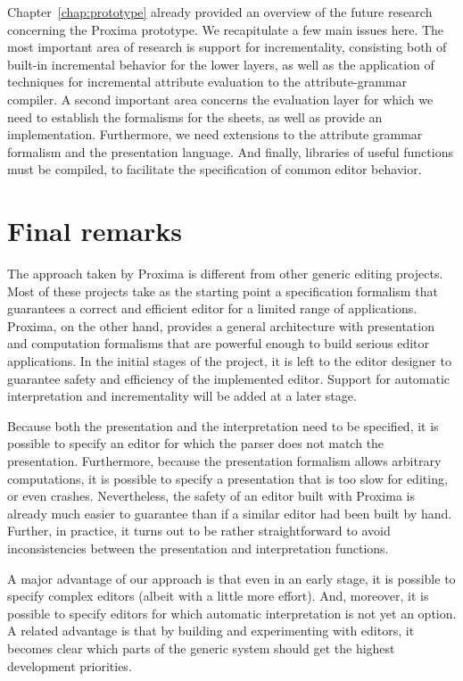 Chapter~\ref{chap:prototype} already provided an overview of the future research concerning the Proxima prototype. We recapitulate a few main issues here. The most important area of research is support for incrementality, consisting both of built-in incremental behavior for the lower layers, as well as the application of techniques for incremental attribute evaluation to the attribute-grammar compiler. A second important area concerns the evaluation layer for which we need to establish the formalisms for the sheets, as well as provide an implementation. Furthermore, we need extensions to the attribute grammar formalism and the {\Xprez} presentation language.  And finally, libraries of useful functions must be compiled, to facilitate the specification of common editor behavior.



\section{Final remarks}

% 
The approach taken by Proxima is different from other generic editing projects. Most of these projects take as the starting point a specification formalism that guarantees a correct and efficient editor for a limited range of applications. Proxima, on the other hand, provides a general architecture with presentation and computation formalisms that are powerful enough to build serious editor applications. In the initial stages of the project, it is left to the editor designer to  guarantee safety and efficiency of the implemented editor. Support for automatic interpretation and incrementality  will be added at a later stage.

Because both the presentation and the interpretation need to be specified, it is possible to specify an editor for which the parser does not match the presentation. Furthermore, because the presentation formalism allows arbitrary computations, it is possible to specify a presentation that is too slow for editing, or even crashes.  Nevertheless, the safety of an editor built with Proxima is already much easier to guarantee than if a similar editor had been built by hand. Further, in practice, it turns out to be rather straightforward to avoid inconsistencies between the presentation and interpretation functions.

A major advantage of our approach is that even in an early stage, it is possible to specify complex editors (albeit with a little more effort). And, moreover, it is possible to specify editors for which automatic interpretation is not yet an option. A related advantage is that by building and experimenting with editors, it becomes clear which parts of the generic system should get the highest development priorities.


